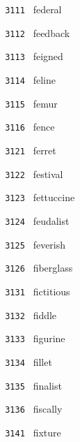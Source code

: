 \documentclass[11pt]{article}
\begin{document}
\begin{multicols}{6}
\small
\noindent \texttt{ 3111 } \hspace{1mm} federal  \par
\noindent \texttt{ 3112 } \hspace{1mm} feedback  \par
\noindent \texttt{ 3113 } \hspace{1mm} feigned  \par
\noindent \texttt{ 3114 } \hspace{1mm} feline  \par
\noindent \texttt{ 3115 } \hspace{1mm} femur  \par
\noindent \texttt{ 3116 } \hspace{1mm} fence  \par
\noindent \texttt{ 3121 } \hspace{1mm} ferret  \par
\noindent \texttt{ 3122 } \hspace{1mm} festival  \par
\noindent \texttt{ 3123 } \hspace{1mm} fettuccine  \par
\noindent \texttt{ 3124 } \hspace{1mm} feudalist  \par
\noindent \texttt{ 3125 } \hspace{1mm} feverish  \par
\noindent \texttt{ 3126 } \hspace{1mm} fiberglass  \par
\noindent \texttt{ 3131 } \hspace{1mm} fictitious  \par
\noindent \texttt{ 3132 } \hspace{1mm} fiddle  \par
\noindent \texttt{ 3133 } \hspace{1mm} figurine  \par
\noindent \texttt{ 3134 } \hspace{1mm} fillet  \par
\noindent \texttt{ 3135 } \hspace{1mm} finalist  \par
\noindent \texttt{ 3136 } \hspace{1mm} fiscally  \par
\noindent \texttt{ 3141 } \hspace{1mm} fixture  \par

\end{multicols}
\end{document}
